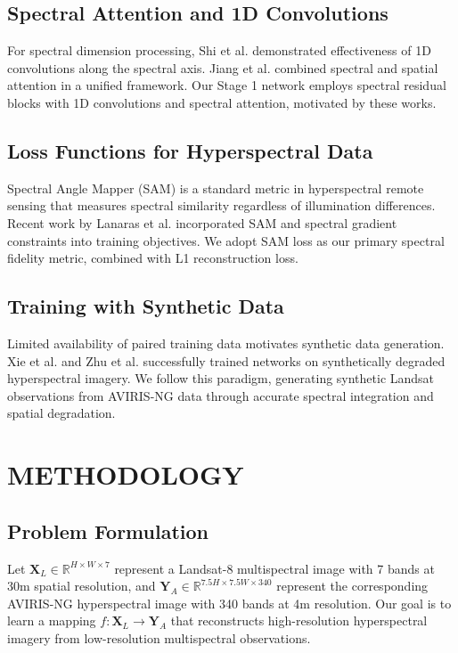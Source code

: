 \documentclass[]{spieman}
\begin{document}
\subsection{Spectral Attention and 1D Convolutions}

For spectral dimension processing, Shi et al. \cite{shi2019spectral} demonstrated effectiveness of 1D convolutions along the spectral axis. Jiang et al. \cite{jiang2020deep} combined spectral and spatial attention in a unified framework. Our Stage 1 network employs spectral residual blocks with 1D convolutions and spectral attention, motivated by these works.

\subsection{Loss Functions for Hyperspectral Data}

Spectral Angle Mapper (SAM) \cite{kruse1993spectral} is a standard metric in hyperspectral remote sensing that measures spectral similarity regardless of illumination differences. Recent work by Lanaras et al. \cite{lanaras2021hyperspectral} incorporated SAM and spectral gradient constraints into training objectives. We adopt SAM loss as our primary spectral fidelity metric, combined with L1 reconstruction loss.

\subsection{Training with Synthetic Data}

Limited availability of paired training data motivates synthetic data generation. Xie et al. \cite{xie2018multispectral} and Zhu et al. \cite{zhu2021hyperspectral} successfully trained networks on synthetically degraded hyperspectral imagery. We follow this paradigm, generating synthetic Landsat observations from AVIRIS-NG data through accurate spectral integration and spatial degradation.

\section{METHODOLOGY}
\label{sec:method}

\subsection{Problem Formulation}

Let $\mathbf{X}_L \in \mathbb{R}^{H \times W \times 7}$ represent a Landsat-8 multispectral image with 7 bands at 30m spatial resolution, and $\mathbf{Y}_A \in \mathbb{R}^{7.5H \times 7.5W \times 340}$ represent the corresponding AVIRIS-NG hyperspectral image with 340 bands at 4m resolution. Our goal is to learn a mapping $f: \mathbf{X}_L \rightarrow \mathbf{Y}_A$ that reconstructs high-resolution hyperspectral imagery from low-resolution multispectral observations.
\end{document}

